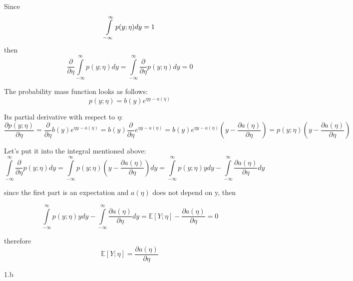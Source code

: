 \begin{answer}
  Since
  \[
  \int\limits_{-\infty}^\infty{p(y;\eta)}{dy} = 1\newline
  \]
  then
  \[
  \frac{\partial}{\partial \eta} \int\limits_{-\infty}^\infty{p(y;\eta)} dy = \int\limits_{-\infty}^\infty \frac{\partial}{\partial \eta}{p(y;\eta)}{dy} = 0
  \]
  
  The probability mass function looks as follows:
  \[
  p(y;\eta) = b(y)e^{\eta y - a(\eta)}
  \]

  Its partial derivative with respect to $\eta$:
  \[
  \frac{\partial p(y;\eta)}{\partial \eta} = \frac{\partial}{\partial \eta} b(y) e^{\eta y - a(\eta)} = b(y)\frac{\partial}{\partial \eta} e^{\eta y - a(\eta)} = b(y) e^{\eta y - a(\eta)} (y - \frac{\partial a(\eta)}{\partial \eta} ) = p(y;\eta) (y - \frac{\partial a(\eta)}{\partial \eta} )
  \]

  Let's put it into the integral mentioned above:
  \[
  \int\limits_{-\infty}^\infty \frac{\partial}{\partial \eta}{p(y;\eta)}{dy} = \int\limits_{-\infty}^\infty{p(y;\eta) (y - \frac{\partial a(\eta)}{\partial \eta} )} dy = \int\limits_{-\infty}^\infty{p(y;\eta)} ydy - \int\limits_{-\infty}^\infty{ \frac{\partial a(\eta)}{\partial \eta}} dy
  \]

  since the first part is an expectation and $a(\eta)$ does not depend on y, then

  \[
  \int\limits_{-\infty}^\infty{p(y;\eta)} ydy - \int\limits_{-\infty}^\infty{ \frac{\partial a(\eta)}{\partial \eta}} dy = \mathbb{E} [Y;\eta] - \frac{\partial a(\eta)}{\partial \eta} = 0
  \]

  therefore
  \[
  \mathbb{E} [Y;\eta] = \frac{\partial a(\eta)}{\partial \eta}
  \]
\end{answer}
\clearpage

\LARGE
1.b
\normalsize

